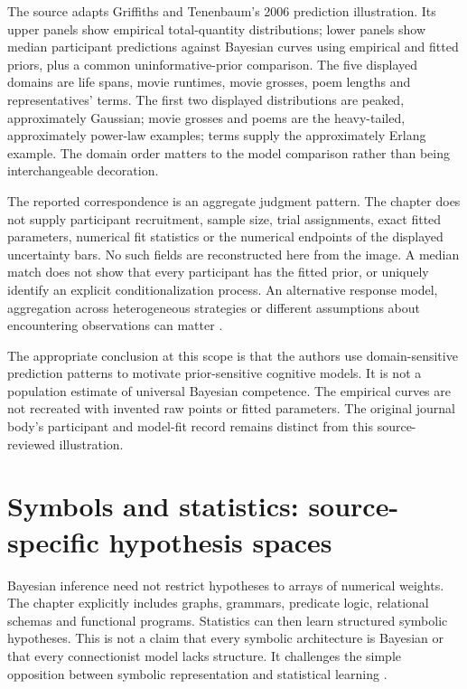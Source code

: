 The source adapts Griffiths and Tenenbaum's 2006 prediction illustration.
Its upper panels show empirical total-quantity distributions; lower panels
show median participant predictions against Bayesian curves using empirical
and fitted priors, plus a common uninformative-prior comparison. The five
displayed domains are life spans, movie runtimes, movie grosses, poem
lengths and representatives' terms. The first two displayed distributions
are peaked, approximately Gaussian; movie grosses and poems are the
heavy-tailed, approximately power-law examples; terms supply the
approximately Erlang example. The domain order matters to the model
comparison rather than being interchangeable decoration.

The reported correspondence is an aggregate judgment pattern. The chapter
does not supply participant recruitment, sample size, trial assignments,
exact fitted parameters, numerical fit statistics or the numerical endpoints
of the displayed uncertainty bars. No such fields are reconstructed here
from the image. A median match does not show that every participant has
the fitted prior, or uniquely identify an explicit conditionalization
process. An alternative response model, aggregation across heterogeneous
strategies or different assumptions about encountering observations can
matter \cite[pp.~23--24, fig.~3.1]{GriffithsTenenbaumKemp2012BayesianInference}.

The appropriate conclusion at this scope is that the authors use
domain-sensitive prediction patterns to motivate prior-sensitive cognitive
models. It is not a population estimate of universal Bayesian competence.
The empirical curves are not recreated with invented raw points or fitted
parameters. The original journal body's participant and model-fit record
remains distinct from this source-reviewed illustration.

\section{Symbols and statistics: source-specific hypothesis spaces}
\label{sec:p19-bci-representations}

Bayesian inference need not restrict hypotheses to arrays of numerical
weights. The chapter explicitly includes graphs, grammars, predicate logic,
relational schemas and functional programs. Statistics can then learn
structured symbolic hypotheses. This is not a claim that every symbolic
architecture is Bayesian or that every connectionist model lacks structure.
It challenges the simple opposition between symbolic representation and
statistical learning \cite[pp.~27--28]{GriffithsTenenbaumKemp2012BayesianInference}.

